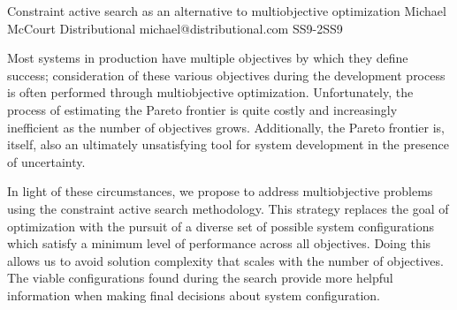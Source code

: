 \begin{talk}
  {Constraint active search as an alternative to multiobjective optimization}%
  {Michael McCourt}%
  {Distributional}%
  {michael@distributional.com}%
  {}%
{}{}{SS9-2}{SS9}

			
Most systems in production have multiple objectives by which they define success; consideration of these various objectives during the development process is often performed through multiobjective optimization.  Unfortunately, the process of estimating the Pareto frontier is quite costly and increasingly inefficient as the number of objectives grows.  Additionally, the Pareto frontier is, itself, also an ultimately unsatisfying tool for system development in the presence of uncertainty.

In light of these circumstances, we propose to address multiobjective problems using the constraint active search methodology.  This strategy replaces the goal of optimization with the pursuit of a diverse set of possible system configurations which satisfy a minimum level of performance across all objectives.  Doing this allows us to avoid solution complexity that scales with the number of objectives.  The viable configurations found during the search provide more helpful information when making final decisions about system configuration.

\end{talk}

